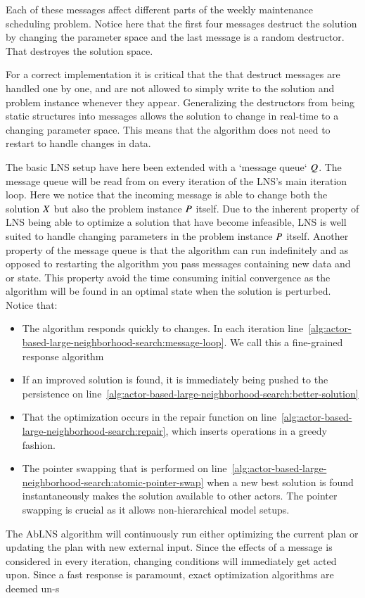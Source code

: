 Each of these messages affect different parts of the weekly maintenance scheduling 
problem. Notice here that the first four messages destruct the solution by
changing the parameter space and the last message is a random destructor. That destroyes
the solution space.

For a correct implementation it is critical that the that destruct messages are 
handled one by one, and are not allowed to simply write to the solution and
problem instance whenever they appear.
Generalizing the destructors from being static structures into messages allows
the solution to change in real-time to a changing parameter space. This means
that the algorithm does not need to restart to handle changes in data.




The basic LNS setup have here been extended with a `message queue` $Q$. The message
queue will be read from on every iteration of the LNS's main iteration loop.
Here we notice that the incoming message is able to change both the solution $X$
but also the problem instance $P$ itself. Due to the inherent property of LNS being
able to optimize a solution that have become infeasible, LNS is well suited to handle changing parameters 
in the problem instance $P$ itself. Another property of the message queue is 
that the algorithm can run indefinitely and as opposed to restarting the algorithm you
pass messages containing new data and or state. This property avoid the time consuming initial
convergence as the algorithm will be found in an optimal state when the
solution is perturbed. Notice that:

\begin{itemize}
    \item The algorithm responds quickly to changes. In each iteration line~\ref{alg:actor-based-large-neighborhood-search:message-loop}. We call this a fine-grained response algorithm
    \item If an improved solution is found, it is immediately being pushed to the persistence on line~\ref{alg:actor-based-large-neighborhood-search:better-solution}
    \item That the optimization occurs in the repair function on line~\ref{alg:actor-based-large-neighborhood-search:repair}, which inserts operations in a greedy fashion. 
	\item The pointer swapping that is performed on line~\ref{alg:actor-based-large-neighborhood-search:atomic-pointer-swap} when a new best solution is found instantaneously makes the solution available to other actors. The pointer swapping is crucial as it allows non-hierarchical model setups. 
\end{itemize}

The AbLNS algorithm will continuously run either optimizing the current plan or updating the plan 
with new external input. Since the effects of a message is considered in every iteration, changing 
conditions will immediately get acted upon. Since a fast response is paramount, exact optimization algorithms are deemed un-s 
